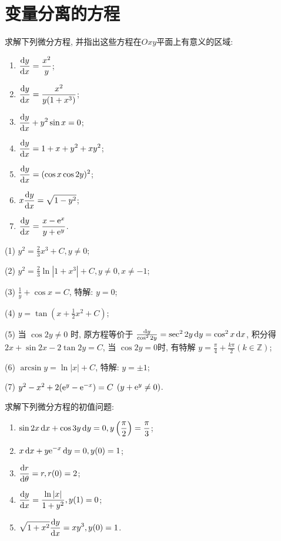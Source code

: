 \section{变量分离的方程}



\begin{exercise}
  求解下列微分方程, 并指出这些方程在$Oxy$平面上有意义的区域:
  \begin{enumerate}[(1)]
  \item $\displaystyle\frac{\mathop{}\!\mathrm{d} y}{\mathop{}\!\mathrm{d} x}=\frac{x^2}{y}$;
  \item $\displaystyle\frac{\mathop{}\!\mathrm{d} y}{\mathop{}\!\mathrm{d} x}=\frac{x^2}{y(1+x^3)}$;
  \item $\displaystyle\frac{\mathop{}\!\mathrm{d} y}{\mathop{}\!\mathrm{d} x}+y^2\sin x=0$;
  \item $\displaystyle\frac{\mathop{}\!\mathrm{d} y}{\mathop{}\!\mathrm{d} x}=1+x+y^2+xy^2$;
  \item $\displaystyle\frac{\mathop{}\!\mathrm{d} y}{\mathop{}\!\mathrm{d} x}=(\cos x\cos 2y)^2$;
  \item $\displaystyle x\frac{\mathop{}\!\mathrm{d} y}{\mathop{}\!\mathrm{d} x}=\sqrt{1-y^2}$;
  \item $\displaystyle\frac{\mathop{}\!\mathrm{d} y}{\mathop{}\!\mathrm{d} x}=\frac{x-\mathrm{e}^x}{y+\mathrm{e}^y}$.
  \end{enumerate}
\end{exercise}

\begin{solve}
  (1) $y^2=\frac{2}{3}x^3+C,y\neq 0$;

  (2) $y^2=\frac{2}{3}\ln|1+x^3|+C,y\neq0,x\neq-1$;

  (3) $\frac{1}{y}+\cos x=C$, 特解: $y=0$;

  (4) $y=\tan(x+\frac{1}{2}x^2+C)$;

  (5) 当 $\cos 2y\neq 0$ 时, 原方程等价于 $\frac{\mathop{}\!\mathrm{d} y}{\cos^2 2y}=\sec^2 2y\mathop{}\!\mathrm{d} y=\cos^2x\mathop{}\!\mathrm{d} x$, 
  积分得 $2x+\sin2x-2\tan2y=C$, 当 $\cos2y=0$时, 有特解 $y=\frac{\pi}{4}+\frac{k\pi}{2}(k\in\mathbb{Z})$;

  (6) $\arcsin y=\ln|x|+C$, 特解: $y=\pm 1$;

  (7) $y^2-x^2+2(\mathrm{e}^y-\mathrm{e}^{-x})=C$ $(y+\mathrm{e}^y\neq 0)$.
\end{solve}



\begin{exercise}
  求解下列微分方程的初值问题:
  \begin{enumerate}[(1)]
  \item $\displaystyle\sin 2x\mathop{}\!\mathrm{d} x+\cos 3y\mathop{}\!\mathrm{d} y=0,y\left(\frac{\pi}{2}\right)=\frac{\pi}{3}$;
  \item $\displaystyle x\mathop{}\!\mathrm{d} x+y\mathrm{e}^{-x}\mathop{}\!\mathrm{d} y=0,y(0)=1$;
  \item $\displaystyle\frac{\mathop{}\!\mathrm{d} r}{\mathop{}\!\mathrm{d}\theta}=r,r(0)=2$;
  \item $\displaystyle\frac{\mathop{}\!\mathrm{d} y}{\mathop{}\!\mathrm{d} x}=\frac{\ln|x|}{1+y^2},y(1)=0$;
  \item $\displaystyle\sqrt{1+x^2}\frac{\mathop{}\!\mathrm{d} y}{\mathop{}\!\mathrm{d} x}=xy^3,y(0)=1$.
  \end{enumerate}
\end{exercise}

